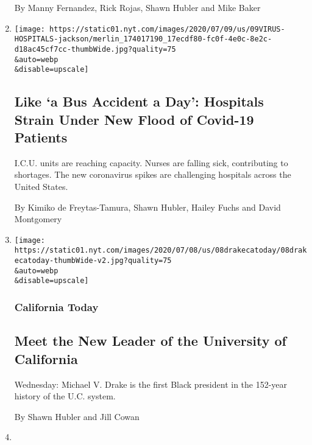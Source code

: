 \begin{enumerate}
  By Manny Fernandez, Rick Rojas, Shawn Hubler and Mike Baker
\item
  \href{/2020/07/09/us/coronavirus-hospitals-capacity.html}{}

  \texttt{[image: https://static01.nyt.com/images/2020/07/09/us/09VIRUS-HOSPITALS-jackson/merlin\_174017190\_17ecdf80-fc0f-4e0c-8e2c-d18ac45cf7cc-thumbWide.jpg?quality=75\\\&auto=webp\\\&disable=upscale]}

  \hypertarget{like-a-bus-accident-a-day-hospitals-strain-under-new-flood-of-covid-19-patients}{%
  \subsection{Like `a Bus Accident a Day': Hospitals Strain Under New
  Flood of Covid-19
  Patients}\label{like-a-bus-accident-a-day-hospitals-strain-under-new-flood-of-covid-19-patients}}

  I.C.U. units are reaching capacity. Nurses are falling sick,
  contributing to shortages. The new coronavirus spikes are challenging
  hospitals across the United States.

  By Kimiko de Freytas-Tamura, Shawn Hubler, Hailey Fuchs and David
  Montgomery
\item
  \href{/2020/07/08/us/new-university-california-president-michael-drake.html}{}

  \texttt{[image: https://static01.nyt.com/images/2020/07/08/us/08drakecatoday/08drakecatoday-thumbWide-v2.jpg?quality=75\\\&auto=webp\\\&disable=upscale]}

  \hypertarget{california-today}{%
  \subsubsection{California Today}\label{california-today}}

  \hypertarget{meet-the-new-leader-of-the-university-of-california}{%
  \subsection{Meet the New Leader of the University of
  California}\label{meet-the-new-leader-of-the-university-of-california}}

  Wednesday: Michael V. Drake is the first Black president in the
  152-year history of the U.C. system.

  By Shawn Hubler and Jill Cowan
\item
  \href{/2020/07/01/us/california-coronavirus-reopening.html}{}


\end{enumerate}

